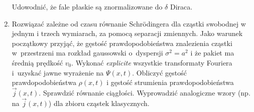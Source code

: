 \documentclass[a4paper,11pt]{article}
\begin{document}
\begin{enumerate}
  Udowodnić, że fale płaskie są znormalizowane do $\delta$ Diraca.

\item Rozwiązać zależne od czasu równanie Schr\"{o}dingera dla cząstki
  swobodnej w jednym i trzech wymiarach, za pomocą separacji
  zmiennych. Jako warunek początkowy przyjąć, że gęstość
  prawdopodobieństwa znalezienia cząstki w~przestrzeni ma rozkład
  gaussowski o~dyspersji $\sigma^{ 2 } = a^{ 2 }$ i że pakiet ma średnią
  prędkość $v_{ 0 }$. Wykonać \emph{explicite} wszystkie transformaty
  Fouriera i~uzyskać jawne wyrażenie na $\Psi( x, t )$. Obliczyć gęstość
  prawdopodobieństwa $\rho( x, t )$ i gęstość strumienia
  prawdopodobieństwa $\vec{ j }( x, t )$. Sprawdzić równanie
  ciągłości. Wyprowadzić analogiczne wzory (np. na
  $\vec{ j }( x, t )$) dla zbioru cząstek klasycznych.
















\end{enumerate}
\end{document}
